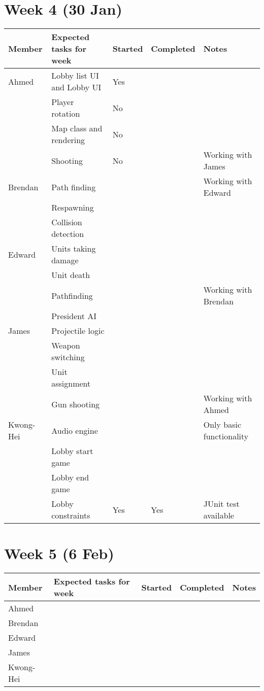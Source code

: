 \documentclass[11pt]{article}
\begin{document}
\section{Week 4 (30 Jan)}
\begin{tabularx}{\textwidth}{|l|l|l|l|X|} \hline
Member & Expected tasks for week & Started & Completed & Notes \\ \hline
Ahmed & Lobby list UI and Lobby UI & Yes & & \\ \hline
      & Player rotation & No & & \\ \hline
      & Map class and rendering & No & & \\ \hline
      & Shooting & No & & Working with James \\ \hline
Brendan & Path finding & & & Working with Edward \\ \hline
        & Respawning & & & \\ \hline
        & Collision detection & & & \\ \hline
Edward & Units taking damage & & & \\ \hline
       & Unit death & & & \\ \hline
       & Pathfinding & & & Working with Brendan \\ \hline
       & President AI & & & \\ \hline
James & Projectile logic & & & \\ \hline
      & Weapon switching & & & \\ \hline
      & Unit assignment & & & \\ \hline
      & Gun shooting & & & Working with Ahmed \\ \hline
Kwong-Hei & Audio engine & & & Only basic functionality \\ \hline
          & Lobby start game & & & \\ \hline
          & Lobby end game & & & \\ \hline
          & Lobby constraints & Yes & Yes & JUnit test available\\ \hline
\end{tabularx}

\section{Week 5 (6 Feb)}
\begin{tabularx}{\textwidth}{|l|l|l|l|X|} \hline
Member & Expected tasks for week & Started & Completed & Notes \\ \hline
Ahmed & & & & \\ \hline
Brendan & & & & \\ \hline
Edward & & & & \\ \hline
James & & & & \\ \hline
Kwong-Hei & & & & \\ \hline
\end{tabularx}
\end{document}

